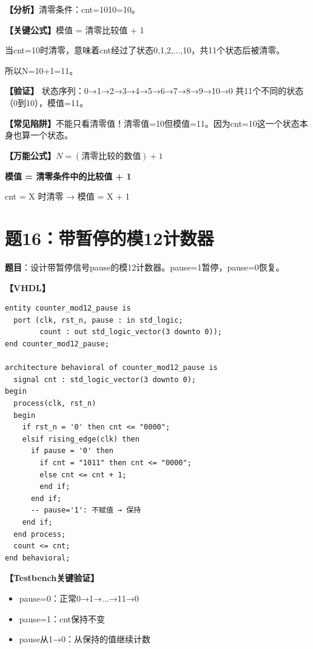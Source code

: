 \begin{solution}[完整解答]

\textbf{【分析】}清零条件：cnt=1010=10。

\textbf{【关键公式】}模值 = 清零比较值 + 1

当cnt=10时清零，意味着cnt经过了状态0,1,2,...,10，共11个状态后被清零。

所以N=10+1=11。

\textbf{【验证】}
状态序列：0→1→2→3→4→5→6→7→8→9→10→0
共11个不同的状态（0到10），模值=11。

\textbf{【常见陷阱】}不能只看清零值！清零值=10但模值=11。因为cnt=10这一个状态本身也算一个状态。

\textbf{【万能公式】}$N = (\text{清零比较的数值}) + 1$

\end{solution}

\begin{quickkill}
\textbf{模值 = 清零条件中的比较值 + 1}

cnt = X 时清零 → 模值 = X + 1
\end{quickkill}


\section{题16：带暂停的模12计数器}

\textbf{题目}：设计带暂停信号pause的模12计数器。pause=1暂停，pause=0恢复。

\begin{solution}[完整解答]

\textbf{【VHDL】}
\begin{lstlisting}
entity counter_mod12_pause is
  port (clk, rst_n, pause : in std_logic;
        count : out std_logic_vector(3 downto 0));
end counter_mod12_pause;

architecture behavioral of counter_mod12_pause is
  signal cnt : std_logic_vector(3 downto 0);
begin
  process(clk, rst_n)
  begin
    if rst_n = '0' then cnt <= "0000";
    elsif rising_edge(clk) then
      if pause = '0' then
        if cnt = "1011" then cnt <= "0000";
        else cnt <= cnt + 1;
        end if;
      end if;
      -- pause='1': 不赋值 → 保持
    end if;
  end process;
  count <= cnt;
end behavioral;
\end{lstlisting}

\textbf{【Testbench关键验证】}
\begin{itemize}
  \item pause=0：正常0→1→...→11→0
  \item pause=1：cnt保持不变
  \item pause从1→0：从保持的值继续计数
\end{itemize}

\end{solution}


